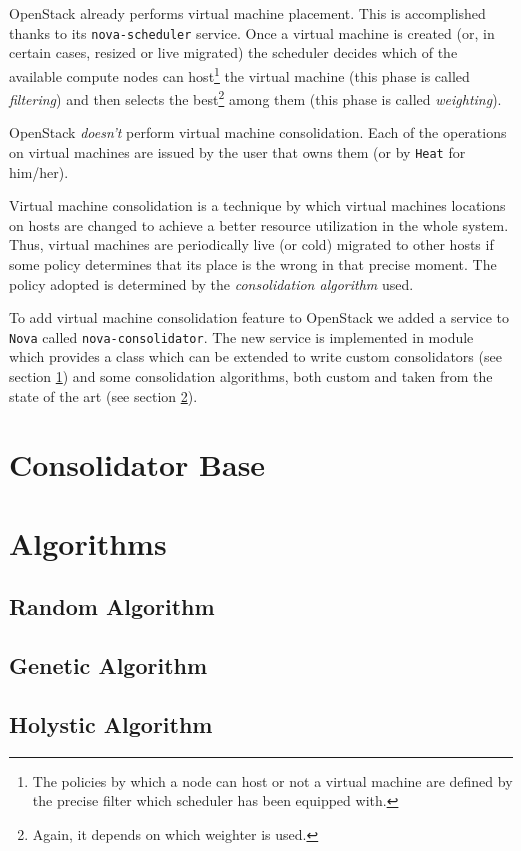 OpenStack already performs virtual machine placement. This is accomplished thanks to its \texttt{nova-scheduler} service. Once a virtual machine is created (or, in certain cases, resized or live migrated) the scheduler decides which of the available compute nodes can host\footnote{The policies by which a node can host or not a virtual machine are defined by the precise filter which scheduler has been equipped with.} the virtual machine (this phase is called \textit{filtering}) and then selects the best\footnote{Again, it depends on which weighter is used.} among them (this phase is called \textit{weighting}).

OpenStack \emph{doesn't} perform virtual machine consolidation. Each of the operations on virtual machines are issued by the user that owns them (or by \texttt{Heat} for him/her).

Virtual machine consolidation is a technique by which virtual machines locations on hosts are changed to achieve a better resource utilization in the whole system. Thus, virtual machines are periodically live (or cold) migrated to other hosts if some policy determines that its place is the wrong in that precise moment. The policy adopted is determined by the \emph{consolidation algorithm} used.

To add virtual machine consolidation feature to OpenStack we added a service to \texttt{Nova} called \texttt{nova-consolidator}. The new service is implemented in module  which provides a  class which can be extended to write custom consolidators (see section \ref{sec:cons_base}) and some consolidation algorithms, both custom and taken from the state of the art (see section \ref{sec:cons_algs}).

\section{Consolidator Base}
\label{sec:cons_base}

\section{Algorithms}
\label{sec:cons_algs}

\subsection{Random Algorithm}
\label{sub:algs_rnd}

\subsection{Genetic Algorithm}
\label{sub:algs_rnd}

\subsection{Holystic Algorithm}
\label{sub:algs_rnd}